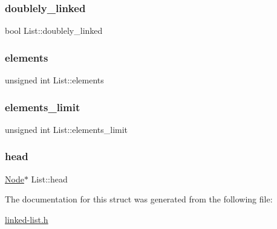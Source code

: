\subsubsection{\texorpdfstring{doublely\+\_\+linked}{doublely\_linked}}
{\footnotesize\ttfamily bool List\+::doublely\+\_\+linked}

\mbox{\label{structList_a388b6c8fff13e506d27071a318c9004f}} 
\subsubsection{\texorpdfstring{elements}{elements}}
{\footnotesize\ttfamily unsigned int List\+::elements}

\mbox{\label{structList_a3858093f64846444abc72e9b31e00e41}} 
\subsubsection{\texorpdfstring{elements\+\_\+limit}{elements\_limit}}
{\footnotesize\ttfamily unsigned int List\+::elements\+\_\+limit}

\mbox{\label{structList_a443db628080a04a1dacfd3015d164735}} 
\subsubsection{\texorpdfstring{head}{head}}
{\footnotesize\ttfamily \hyperlink{structNode}{Node}$\ast$ List\+::head}



The documentation for this struct was generated from the following file\+:\begin{DoxyCompactItemize}
\item 
\hyperlink{linked-list_8h}{linked-\/list.\+h}\end{DoxyCompactItemize}
